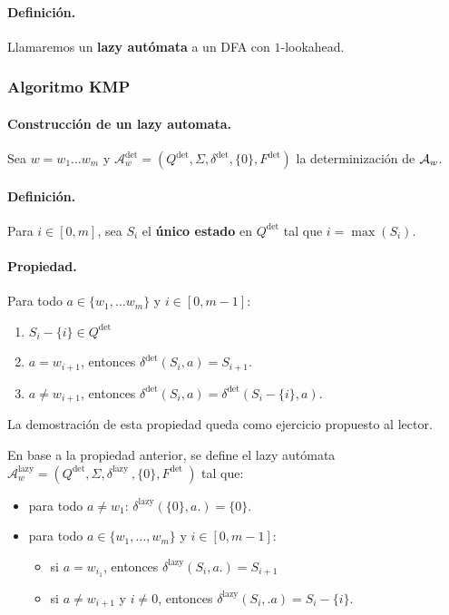 \paragraph{Definición.} Llamaremos un \textbf{lazy autómata} a un DFA con $1$-lookahead.

\subsubsection{Algoritmo KMP}

\paragraph{Construcción de un lazy automata.} Sea $w = w_1 \ldots w_m$ y $\mathcal{A}_w^{\mathrm{det}}=\left(Q^{\mathrm{det}}, \Sigma, \delta^{\mathrm{det}},\{0\}, F^{\mathrm{det}}\right)$ la determinización de $\mathcal{A}_w$.

\paragraph{Definición.} Para $i \in [0,m]$, sea $S_i$ el \textbf{único estado} en $Q^\text{det}$ tal que $i = \max(S_i)$.

\paragraph{Propiedad.} Para todo $a \in \{w_1,\ldots w_m\}$ y $i \in [0,m-1]$:
\begin{enumerate}
    \item $S_i-\{i\} \in Q^{\operatorname{det}}$
    \item $a=w_{i+1}$, entonces $\delta^{\operatorname{det}}\left(S_i, a\right)=S_{i+1}$.
    \item $a \neq w_{i+1}$, entonces $\delta^{\operatorname{det}}\left(S_i, a\right)=\delta^{\operatorname{det}}\left(S_i-\{i\}, a\right)$.
\end{enumerate}
La demostración de esta propiedad queda como ejercicio propuesto al lector. \medbreak

En base a la propiedad anterior, se define el lazy autómata $\mathcal{A}_w^{\text {lazy}}=\left(Q^{\text {det}}, \Sigma, \delta^{\text {lazy }},\{0\}, F^{\text {det }}\right)$ tal que:
\begin{itemize}
    \item para todo $a\neq w_1$: $\delta^{\text {lazy}}(\{0\}, a .)=\{0\}$.
    \item para todo $a \in \{w_1,\ldots, w_m\}$ y $i \in [0,m-1]$:
          \begin{itemize}
              \item si $a = w_{i_1}$, entonces $\delta^{\text {lazy}}\left(S_i, a.\right)=S_{i+1}$
              \item si $a \neq w_{i+1}$ y $i \neq 0$, entonces $\delta^{\text {lazy}}\left(S_i, . a\right)=S_i-\{i\}$.
          \end{itemize}
\end{itemize}

